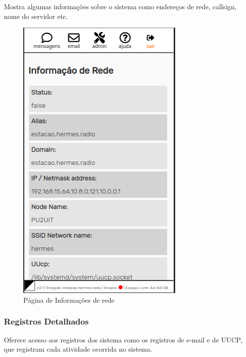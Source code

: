 \documentclass[11pt,a4paper]{article}
\begin{document}
Mostra algumas informações sobre o sistema como endereços de rede, callsign, nome do servidor etc.
     \begin{figure}[H]
     \vspace{-10pt}
    \centering
    \includegraphics[width=0.5\columnwidth]{screenshots/frontend/pt_kn/networkinfo.png}
    \caption{Página de Informações de rede}
    \label{fig:netinfo}
  
    \end{figure}
    
 


    
\subsubsection{Registros Detalhados}
Oferece acesso aos registros dos sistema como os registros de e-mail e de UUCP, que registram cada atividade ocorrida no sistema.
    
\end{document}
